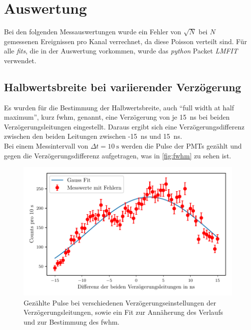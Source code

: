 \newpage
\section{Auswertung}
\label{sec:auswertung}

Bei den folgenden Messauswertungen wurde ein Fehler von $\sqrt{N}$ bei $N$ gemessenen Ereignissen pro Kanal verrechnet, da diese Poisson verteilt sind.
Für alle \textit{fits}, die in der Auswertung vorkommen, wurde das \textit{python} Packet \textit{LMFIT} verwendet\cite{lmfit}.

\subsection{Halbwertsbreite bei variierender Verzögerung}
Es wurden für die Bestimmung der Halbwertsbreite, auch \enquote{full width at half maximum}, kurz fwhm, genannt, eine Verzögerung von je \SI{15}{\nano\second} bei beiden Verzögerungsleitungen eingestellt.
Daraus ergibt sich eine Verzögerungsdifferenz zwischen den beiden Leitungen zwischen -\SI{15}{\nano\second} und \SI{15}{\nano\second}.\\
Bei einem Messintervall von $\Delta t = \SI{10}{\second}$ werden die Pulse der PMTs gezählt und gegen die Verzögerungsdifferenz aufgetragen, was in \autoref{fig:fwhm} zu sehen ist.

\begin{figure}[H]
    \centering
    \includegraphics{images/fwhm.pdf}
    \caption{Gezählte Pulse bei verschiedenen Verzögerungseinstellungen der Verzögerungsleitungen, sowie ein Fit zur Annäherung des Verlaufs und zur Bestimmung des fwhm.}
    \label{fig:fwhm}
\end{figure}

